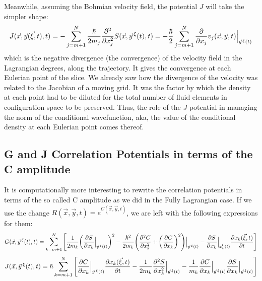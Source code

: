 \documentclass[11pt, a4paper]{article} %
\begin{document}
Meanwhile, assuming the Bohmian velocity field, the potential $J$ will take the simpler shape:
\begin{equation}\label{J.Bohm}
J(\vec{x},\vec{y}(\vec{\xi},t),t)=-\sum_{j=m+1}^N\frac{\hbar}{2m_j}\pdv[2]{}{x_j}S(\vec{x},\vec{y}^{\, \xi}(t),t)=-\frac{\hbar}{2}\sum_{j=m+1}^N\pdv{}{x_j}v_j(\vec{x},\vec{y},t)\Big\rvert_{\vec{y}^{\, \xi}(t)}
\end{equation}
which is the negative divergence (the convergence) of the velocity field in the Lagrangian degrees, along the trajectory. It gives the convergence at each Eulerian point of the slice. We already saw how the divergence of the velocity was related to the Jacobian of a moving grid. It was the factor by which the density at each point had to be diluted for the total number of fluid elements in configuration-space to be preserved. Thus, the role of the $J$ potential in managing the norm of the conditional wavefunction, aka, the value of the conditional density at each Eulerian point comes thereof.
\subsection*{G and J Correlation Potentials in terms of the C amplitude}
It is computationally more interesting to rewrite the correlation potentials in terms of the so called C amplitude as we did in the Fully Lagrangian case. If we use the change $R(\vec{x},\vec{y},t)=e^{C(\vec{x},\vec{y},t)}$, we are left with the following expressions for them:
\begin{equation}
G(\vec{x}, \vec{y}^{\, \xi}(t),t)=  \sum_{k=m+1}^N \qty[\frac{1}{2m_k} \qty(\pdv{S}{x_k}\Big\rvert_{\vec{y}^{\, \xi}(t)})^2 -\frac{\hbar^2}{2m_k}\qty(\pdv[2]{C}{x_k}+\qty(\pdv{C}{x_k})^2)\Big\rvert_{\vec{y}^{\, \xi}(t)} -\pdv{S}{x_k}\Big\rvert_{x_k^\xi(t)} \pdv{x_k(\vec{\xi},t)}{t} ]
\end{equation}
\begin{equation}
J(\vec{x}, \vec{y}^{\, \xi}(t),t)= \hbar\sum_{k=m+1}^N \qty[ \pdv{C}{x_k}\Big\rvert_{\vec{y}^{\, \xi}(t)} \pdv{x_k(\vec{\xi},t)}{t} - \frac{1}{2m_k} \pdv[2]{S}{x_k}\Big\rvert_{\vec{y}^{\, \xi}(t)}-\frac{1}{m_k}\pdv{C}{x_k}\Big\rvert_{\vec{y}^{\, \xi}(t)}  \pdv{S}{x_k} \Big\rvert_{\vec{y}^{\, \xi}(t)} ]
\end{equation}
\end{document}
